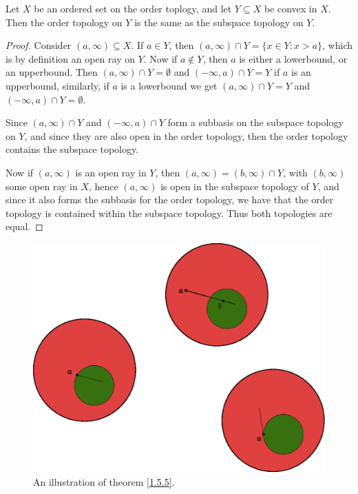 \begin{theorem}\label{1.5.5}
    Let $X$ be an ordered set on the order toplogy, and let  $Y \subseteq X$ be convex in  $X$.
    Then the order topology on  $Y$ is the same as the subspace topology on  $Y$.
\end{theorem}
\begin{proof}
    Consider $(a, \infty) \subseteq X$. If  $a \in Y$, then  $(a,\infty) \cap Y=\{x \in Y: x>a\}$,
    which is by definition an open ray on $Y$. Now if  $a \notin Y$, then  $a$ is either a lowerbound, or
    an upperbound. Then  $(a, \infty) \cap Y=\emptyset$ and  $(-\infty,a) \cap Y=Y$ if  $a$ is an
    upperbound, similarly, if  $a$ is a lowerbound we get  $(a, \infty) \cap Y=Y$ and  $(-\infty,a) \cap Y=\emptyset$.

    Since $(a, \infty) \cap Y$ and  $(-\infty,a) \cap Y$ form a subbasis on the subspace topology on  $Y$,
    and since they are also open in  the order topology, then the order topology contains the subspace topology.

    Now if  $(a, \infty)$ is an open ray in  $Y$, then  $(a,\infty)=(b,\infty) \cap Y$, with $(b, \infty)$
    some open ray in  $X$, hence  $(a, \infty)$ is open in the subspace topology of  $Y$, and since
    it also forms the subbasis for the order topology, we have that the order
    topology is contained within the subspace topology. Thus both topologies are
    equal.
\end{proof}

\begin{figure}[h]
    \centering
    \includegraphics[scale = 0.5]{Figures/Chapter1/thm_1_55.eps}
    \caption{An illustration of theorem \ref{1.5.5}.}
    \label{fig1.7}
\end{figure}


